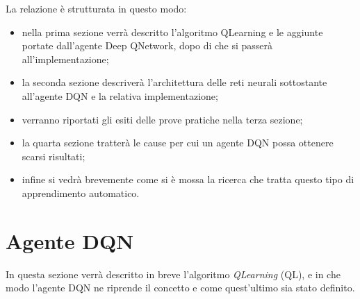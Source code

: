 \documentclass[twoside,twocolumn,10pt]{extarticle}
\theoremstyle{definition}
\begin{document}
	La relazione è strutturata in questo modo:
	\begin{itemize}
		\item nella prima sezione verrà descritto l'algoritmo Q\texttwelveudash Learning e le aggiunte portate dall'agente Deep Q\texttwelveudash Network, dopo di che si passerà all'implementazione;
		\item la seconda sezione descriverà l'architettura delle reti neurali sottostante all'agente DQN e la relativa implementazione;
		\item verranno riportati gli esiti delle prove pratiche nella terza sezione;
		\item la quarta sezione tratterà le cause per cui un agente DQN possa ottenere scarsi risultati;
		\item infine si vedrà brevemente come si è mossa la ricerca che tratta questo tipo di apprendimento automatico.
	\end{itemize}
	
\section{Agente DQN}\label{sec:dqn-agent}
	In questa sezione verrà descritto in breve l'algoritmo \textit{Q\texttwelveudash Learning} (QL), e in che modo l'agente DQN ne riprende il concetto e come quest'ultimo sia stato definito.
\end{document}
